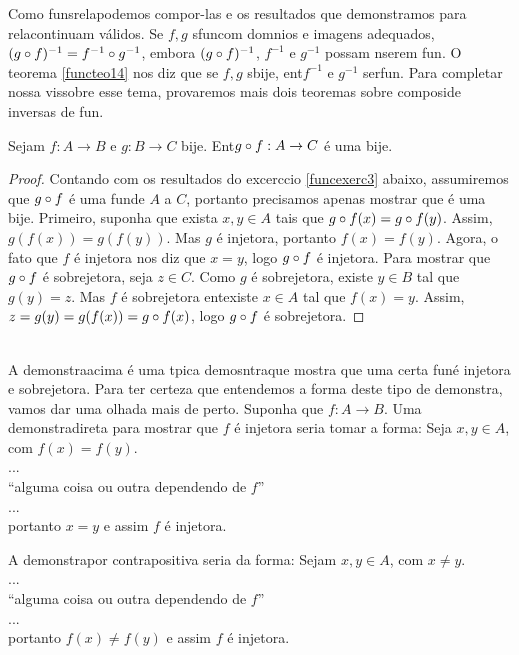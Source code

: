 Como fun\coes s\ao rela\coes podemos compor-las e os resultados que demonstramos para rela\coes continuam v\'alidos. Se $f,g$ s\ao fun\coes com dom\ih nios e imagens adequados, $(g\circ f)^{-1}=f^{-1}\circ g^{-1}$, embora $(g\circ f)^{-1}$, $f^{-1}$ e $g^{-1}$ possam n\ao serem fun\cois. O teorema \ref{functeo14} nos diz que se $f,g$ s\ao bije\cois, ent\ao $f^{-1}$ e $g^{-1}$ ser\ao fun\cois. Para completar nossa vis\ao sobre esse tema, provaremos mais dois teoremas sobre composi\cao de inversas de fun\cois.
\begin{teob}\label{functeo15}
Sejam $f:A\to B$ e $g:B\to C$ bije\cois. Ent\ao $g\circ f:A\to C$ \'e uma bije\caoi. 
\end{teob}
\begin{proof}
Contando com os resultados do excerc\ih cio \ref{funcexerc3} abaixo, assumiremos que $g\circ f$ \'e uma fun\cao de $A$ a $C$, portanto precisamos apenas mostrar que \'e uma bije\caoi. Primeiro, suponha que exista $x,y\in A$ tais que $g\circ f(x)=g\circ f(y)$. Assim, $g(f(x))=g(f(y))$. Mas $g$ \'e injetora, portanto $f(x)=f(y)$. Agora, o fato que $f$ \'e injetora nos diz que $x=y$, logo $g\circ f$ \'e injetora. Para mostrar que $g\circ f$ \'e sobrejetora, seja $z\in C$. Como $g$ \'e sobrejetora, existe $y\in B$ tal que $g(y)=z$. Mas $f$ \'e sobrejetora ent\ao existe $x\in A$ tal que $f(x)=y$. Assim, $z=g(y)=g(f(x))=g\circ f(x)$, logo $g\circ f$ \'e sobrejetora.
\end{proof}
\\

A demonstra\cao acima \'e uma t\ih pica demosntra\cao que mostra que uma certa fun\cao \'e injetora e sobrejetora. Para ter certeza que entendemos a forma deste tipo de demonstra\caoi, vamos dar uma olhada mais de perto. Suponha que $f:A\to B$. Uma demonstra\cao direta para mostrar que $f$ \'e injetora seria tomar a forma: Seja $x,y\in A$, com $f(x)=f(y)$.
\\
...
\\ 
``alguma coisa ou outra dependendo de $f$''
\\
...
\\
portanto $x=y$ e assim $f$ \'e injetora.

A demonstra\cao por contrapositiva seria da forma: Sejam $x,y\in A$, com $x\neq y$.
\\
...
\\ 
``alguma coisa ou outra dependendo de $f$''
\\
...
\\
portanto $f(x)\neq f(y)$ e assim $f$ \'e injetora.

